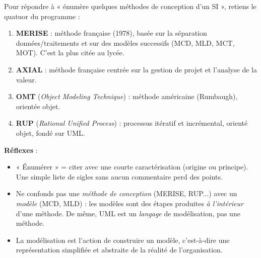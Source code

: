 \documentclass[11pt]{article}
\newcommand{\cle}[1]{{\popxbold\color{popdark}#1}}
\begin{document}
\begin{methode}
Pour répondre à « énumère quelques méthodes de conception d'un SI », retiens le quatuor du programme :
\begin{enumerate}
\item \textbf{MERISE} : méthode française (1978), basée sur la séparation données/traitements et sur des modèles successifs (MCD, MLD, MCT, MOT). C'est la plus citée au lycée.
\item \textbf{AXIAL} : méthode française centrée sur la gestion de projet et l'analyse de la valeur.
\item \textbf{OMT} (\emph{Object Modeling Technique}) : méthode américaine (Rumbaugh), orientée objet.
\item \textbf{RUP} (\emph{Rational Unified Process}) : processus itératif et incrémental, orienté objet, fondé sur UML.
\end{enumerate}
\textbf{Réflexes} :
\begin{itemize}
\item « Énumérer » = citer avec une courte caractérisation (origine ou principe). Une simple liste de sigles sans aucun commentaire perd des points.
\item Ne confonds pas une \emph{méthode de conception} (MERISE, RUP...) avec un \emph{modèle} (MCD, MLD) : les modèles sont des étapes produites \emph{à l'intérieur} d'une méthode. De même, UML est un \emph{langage} de modélisation, pas une méthode.
\item La \cle{modélisation} est l'action de construire un \cle{modèle}, c'est-à-dire une représentation simplifiée et abstraite de la réalité de l'organisation.
\end{itemize}
\end{methode}
\end{document}
